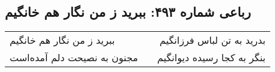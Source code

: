 \begin{center}
\section*{رباعی شماره ۴۹۳: ببرید ز من نگار هم خانگیم}
\label{sec:sh493}
\begin{longtable}{l p{0.5cm} r}
ببرید ز من نگار هم خانگیم
&&
بدرید به تن لباس فرزانگیم
\\
مجنون به نصیحت دلم آمده‌است
&&
بنگر به کجا رسیده دیوانگیم
\\
\end{longtable}
\end{center}

